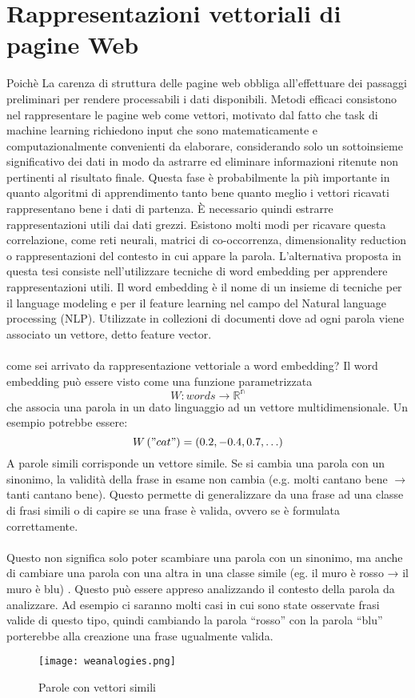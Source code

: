 \section{Rappresentazioni vettoriali di pagine Web}
Poichè 
La carenza di struttura delle pagine web obbliga all'effettuare dei passaggi preliminari per rendere processabili i dati disponibili. Metodi efficaci consistono nel rappresentare le pagine web come vettori, motivato dal fatto che task di machine learning richiedono input che sono matematicamente e computazionalmente convenienti da elaborare, considerando solo un sottoinsieme significativo dei dati in modo da astrarre ed eliminare informazioni ritenute non pertinenti al risultato finale. Questa fase è probabilmente la più importante in quanto algoritmi di apprendimento tanto bene quanto meglio i vettori ricavati rappresentano bene i dati di partenza. È necessario quindi estrarre rappresentazioni utili dai dati grezzi. Esistono molti modi per ricavare questa correlazione, come reti neurali, matrici di co-occorrenza, dimensionality reduction o rappresentazioni del contesto in cui appare la parola. L'alternativa proposta in questa tesi consiste nell'utilizzare tecniche di word embedding per apprendere rappresentazioni utili.
Il word embedding è il nome di un insieme di tecniche per il language modeling e per il feature learning nel campo del Natural language processing (NLP)\cite{Bengio03}. Utilizzate  in collezioni di documenti dove ad ogni parola viene associato un vettore, detto feature vector. 
\\\\
\color{red}come sei arrivato da rappresentazione vettoriale a word embedding?\color{black}
Il word embedding può essere visto come una funzione parametrizzata 
\begin{equation}
  W : words \to \mathbb{R^n}
\end{equation}
che associa una parola in un dato linguaggio ad un vettore multidimensionale. Un esempio potrebbe essere:
\begin{equation}
  W\left ( "cat" \right ) = \left ( 0.2, -0.4, 0.7, \ldots \right )
\end{equation}
A parole simili corrisponde un vettore simile. Se si cambia una parola con un sinonimo, la validità della frase in esame non cambia (e.g. molti cantano bene $\to$ tanti cantano bene). Questo permette di generalizzare da una frase ad una classe di frasi simili o di capire se una frase è valida, ovvero se  è formulata correttamente.  
\\\\
Questo non significa solo poter scambiare una parola con un sinonimo, ma anche di cambiare una parola con una altra in una classe simile (eg. il muro è rosso → il muro è blu) \cite{Collobert11}. Questo può essere appreso analizzando il contesto della parola da analizzare. Ad esempio ci saranno molti casi in cui sono state osservate frasi valide di questo tipo, quindi cambiando la parola “rosso” con la parola “blu” porterebbe alla creazione una frase ugualmente valida. 
\begin{figure}[htb]
	\centering
	\texttt{[image: weanalogies.png]}
	\caption{Parole con vettori simili}
	\label{similarwords}
\end{figure}

